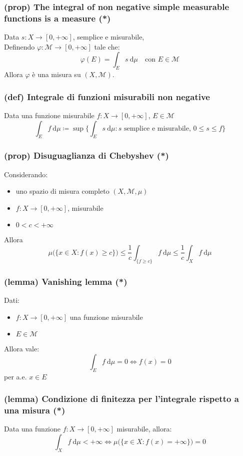 \subsubsection{(prop) The integral of non negative simple measurable functions is a measure (*)}
Data $s:X\to[0,+\infty]$, semplice e misurabile,\\
Definendo $\varphi:\mathcal M\to[0,+\infty]$ tale che:
$$\varphi(E)=\int_E s\ \mathrm{d}\mu\quad\text{con } E\in \mathcal M$$
Allora $\varphi$ è una misura su $(X,\mathcal M)$.
\subsubsection{(def) Integrale di funzioni misurabili non negative}
Data una funzione misurabile $f:X\to[0,+\infty]$, $E\in\mathcal M$
$$\int_E f\ \mathrm{d}\mu\coloneqq \sup\Big\{\int_E s\ \mathrm d\mu: s \text{ semplice e misurabile, } 0\le s\le f\Big\}$$
\subsubsection{(prop) Disuguaglianza di Chebyshev (*)}
Considerando: 
\begin{itemize}
    \item uno spazio di misura completo $(X,\mathcal M,\mu)$
    \item $f:X\to[0,+\infty]$, misurabile
    \item $0<c<+\infty$ 
\end{itemize}
Allora
$$\mu\Big(\{x\in X:f(x)\ge c\}\Big)\le\frac1c\int_{\{f\ge c\}}f\ \mathrm{d}\mu \le \frac1c\int_X f\ \mathrm{d}\mu$$
\subsubsection{(lemma) Vanishing lemma (*)}
Dati:
\begin{itemize}
    \item $f:X\to[0,+\infty]$ una funzione misurabile
    \item $E\in\mathcal M$
\end{itemize}
Allora vale:
$$\int_Ef\ \mathrm{d}\mu=0\iff f(x)=0$$ per a.e. $x\in E$
\subsubsection{(lemma) Condizione di finitezza per l'integrale rispetto a una misura (*)}
Data una funzione $f:X\to [0,+\infty]$ misurabile, allora:
$$\int_X f\ \mathrm d\mu<+\infty \iff \mu\Big(\Big\{x\in X:f(x)=+\infty\Big\}\Big)=0$$
